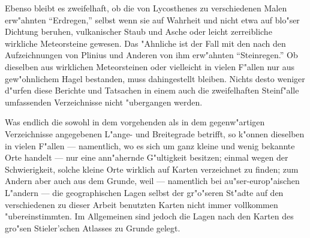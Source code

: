 \documentclass[a4paper, 8pt, oneside, polutonikogreek, german]{article}
\begin{document}
Ebenso bleibt es zweifelhaft, ob die von Lycosthenes zu verschiedenen Malen erw"ahnten "`Erdregen,"' selbst wenn sie auf Wahrheit und nicht etwa auf blo"ser Dichtung beruhen, vulkanischer Staub und Asche oder leicht zerreibliche wirkliche Meteorsteine gewesen. Das "Ahnliche ist der Fall mit den nach den Aufzeichnungen von Plinius und Anderen von ihm erw"ahnten "`Steinregen."' Ob dieselben aus wirklichen Meteorsteinen oder vielleicht in vielen F"allen nur aus gew"ohnlichem Hagel bestanden, muss dahingestellt bleiben. Nichts desto weniger d"urfen diese Berichte und Tatsachen in einem auch die zweifelhaften Steinf"alle umfassenden Verzeichnisse nicht "ubergangen werden.

Was endlich die sowohl in dem vorgehenden als in dem gegenw"artigen Verzeichnisse angegebenen L"ange- und Breitegrade betrifft, so k"onnen dieselben in vielen F"allen --- namentlich, wo es sich um ganz kleine und wenig bekannte Orte handelt --- nur eine ann"ahernde G"ultigkeit besitzen; einmal wegen der Schwierigkeit, solche kleine Orte wirklich auf Karten verzeichnet zu finden; zum Andern aber auch aus dem Grunde, weil --- namentlich bei au"ser-europ"aischen L"andern --- die geographischen Lagen selbst der gr"o"seren St"adte auf den verschiedenen zu dieser Arbeit benutzten Karten nicht immer vollkommen "ubereinstimmten. Im Allgemeinen sind jedoch die Lagen nach den Karten des gro"sen Stieler'schen Atlasses zu Grunde gelegt.
\clearpage
\end{document}
